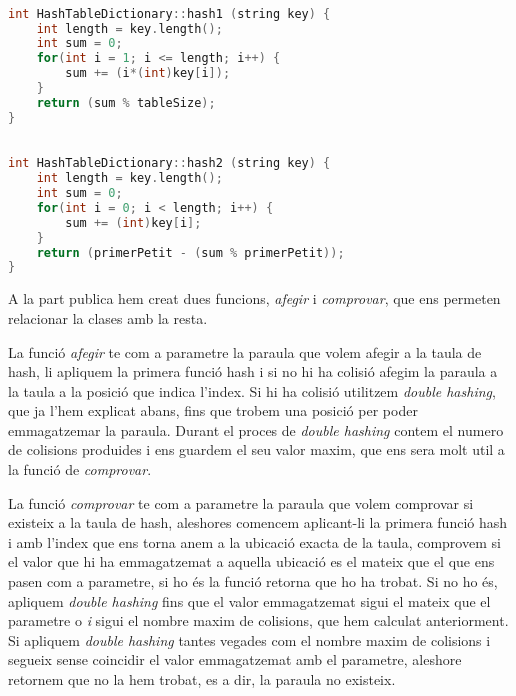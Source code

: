 \documentclass[titlepage]{article}
\begin{document}
\begin{lstlisting}[language=C++, caption=Primera funció de hash]

int HashTableDictionary::hash1 (string key) {
    int length = key.length();
    int sum = 0;
    for(int i = 1; i <= length; i++) {
        sum += (i*(int)key[i]);
    }
    return (sum % tableSize);
}


\end{lstlisting}
\begin{lstlisting}[language=C++, caption=Segona funció de hash(pel double hashing)]

int HashTableDictionary::hash2 (string key) {
    int length = key.length();
    int sum = 0;
    for(int i = 0; i < length; i++) {
        sum += (int)key[i];
    }
    return (primerPetit - (sum % primerPetit));
} 
\end{lstlisting}

A la part publica hem creat dues funcions, \textit{afegir} i \textit{comprovar}, que ens permeten relacionar la clases amb la resta.
\newline\par
La funció \textit{afegir} te com a parametre la paraula que volem afegir a la taula de hash, li apliquem la primera funció hash i si no hi ha colisió afegim la paraula a la taula a la posició que indica l'index. Si hi ha colisió utilitzem \textit{double hashing}, que ja l'hem explicat abans, fins que trobem una posició per poder emmagatzemar la paraula. Durant el proces de \textit{double hashing} contem el numero de colisions produides i ens guardem el seu valor maxim, que ens sera molt util a la funció de \textit{comprovar}.
\newline\par
La funció \textit{comprovar} te com a parametre la paraula que volem comprovar si existeix a la taula de hash, aleshores comencem aplicant-li la primera funció hash i amb l'index que ens torna anem a la ubicació exacta de la taula, comprovem si el valor que hi ha emmagatzemat a aquella ubicació es el mateix que el que ens pasen com a parametre, si ho és la funció retorna que ho ha trobat. 
Si no ho és, apliquem \textit{double hashing} fins que el valor emmagatzemat sigui el mateix que el parametre o \textit{i} sigui el nombre maxim de colisions, que hem calculat anteriorment. Si apliquem \textit{double hashing} tantes vegades com el nombre maxim de colisions i segueix sense coincidir el valor emmagatzemat amb el parametre, aleshore retornem que no la hem trobat, es a dir, la paraula no existeix.
\end{document}
